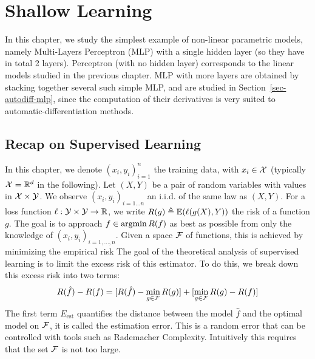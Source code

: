
\chapter{Shallow Learning}
\label{c-shallow-learning}




In this chapter, we study the simplest example of non-linear parametric models, namely Multi-Layers Perceptron (MLP) with a single hidden layer (so they have in total 2 layers). Perceptron (with no hidden layer) corresponds to the linear models studied in the previous chapter. MLP with more layers are obtained by stacking together several such simple MLP, and are studied in Section~\ref{sec-autodiff-mlp}, since the computation of their derivatives is very suited to automatic-differentiation methods.  


\section{Recap on Supervised Learning}

In this chapter, we denote $(x_i,y_i)_{i=1}^n$ the training data, with $x_i \in \mathcal{X}$ (typically $\mathcal{X}=\mathbb{R}^d$ in the following). 
%
Let $(X, Y)$ be a pair of random variables with values in $\mathcal{X} \times \mathcal{Y}$. We observe $(x_i, y_i)_{i = 1 \ldots n} $ an i.i.d. of the same law as $(X, Y) $.
%
For a loss function $\ell : \mathcal{Y} \times \mathcal{Y} \rightarrow \mathbb{R} $, we write $R(g) \triangleq \mathbb{E}( \ell(g(X) , Y))$ the risk of a function $g$. The goal is to approach $f \in \operatorname{argmin} R(f)$ as best as possible from only the knowledge of $(x_i, y_i)_{i = 1, \ldots, n}$. Given a space $\mathcal{F}$ of functions, this is achieved by minimizing the empirical risk
The goal of the theoretical analysis of supervised learning is to limit the excess risk of this estimator. To do this, we break down this excess risk into two terms:
\begin{equation} \label{eq:risk}
  R(\hat{f}) - R(f) =
    [R(\hat{f}) - \min_{g \in \mathcal{F}} R(g)]
    +
    [\min_{g \in \mathcal{F}} R(g) - R(f)]
\end{equation}
The first term $ E_{\text{est}} $ quantifies the distance between the model $\hat{f}$ and the optimal model on $ \mathcal{F} $, it is called the estimation error. This is a random error that can be controlled with tools such as Rademacher Complexity. Intuitively this requires that the set $ \mathcal{F} $ is not too large. 
 
